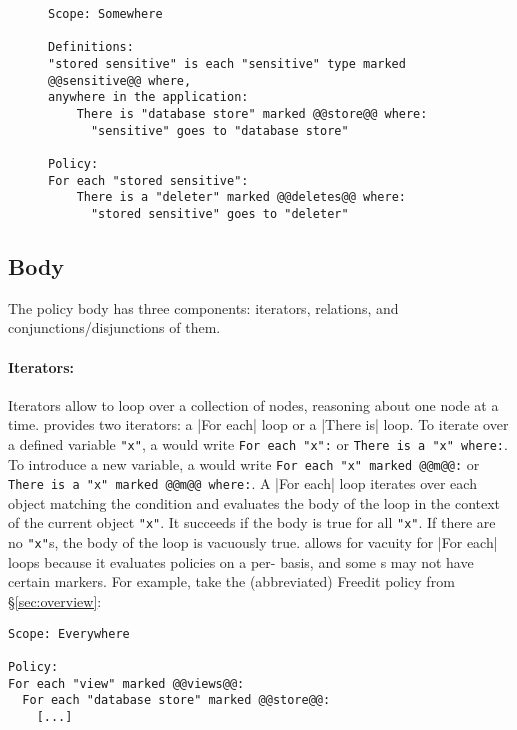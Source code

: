 \begin{figure}[h]
\begin{lstlisting}[language=CNL]
Scope: Somewhere

Definitions:
"stored sensitive" is each "sensitive" type marked @@sensitive@@ where, 
anywhere in the application:
    There is "database store" marked @@store@@ where:
      "sensitive" goes to "database store"

Policy:
For each "stored sensitive":
    There is a "deleter" marked @@deletes@@ where:
      "stored sensitive" goes to "deleter"
\end{lstlisting}
\end{figure}

\subsection{Body}
\label{sec:body}

The policy body has three components: iterators, relations, and conjunctions/disjunctions of them.
%
\paragraph{Iterators: }
Iterators allow \ces{} to loop over a collection of nodes, reasoning about one node at a time.
%
\syslang{} provides two iterators: a |For each| loop or a |There is| loop.
%
To iterate over a defined variable \lstinline[language=CNL]|"x"|, 
a \ce{} would write \lstinline[language=CNL]|For each "x":| or \lstinline[language=CNL]|There is a "x" where:|.
%
To introduce a new variable,
a \ce{} would write \lstinline[language=CNL]|For each "x" marked @@m@@:| or \lstinline[language=CNL]|There is a "x" marked @@m@@ where:|.
%
A |For each| loop iterates over each object matching the condition and evaluates the body of the loop 
in the context of the current object \lstinline[language=CNL]|"x"|.
%
It succeeds if the body is true for all \lstinline[language=CNL]|"x"|.
%
If there are no \lstinline[language=CNL]|"x"|s, the body of the loop is vacuously true.
%
\syslang{} allows for vacuity for |For each| loops because it evaluates policies on a per-\controller{} basis,
and some \controller{}s may not have certain markers.
%
For example, take the (abbreviated) Freedit policy from \S\ref{sec:overview}:
\begin{lstlisting}[language=CNL]
Scope: Everywhere

Policy:
For each "view" marked @@views@@:
  For each "database store" marked @@store@@:
    [...]
\end{lstlisting}

